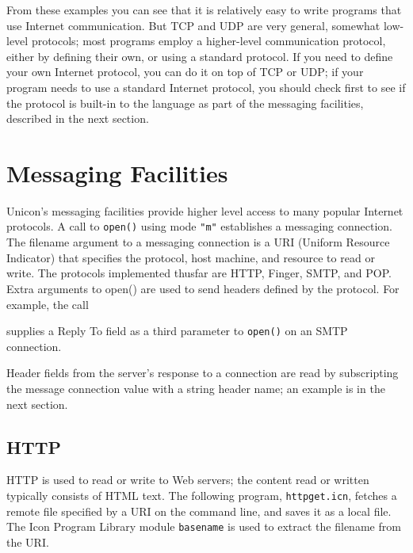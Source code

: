 From these examples you can see that it is relatively easy to write
programs that use Internet communication. But TCP and UDP are very
general, somewhat low-level protocols; most programs employ a
higher-level communication protocol, either by defining their own, or
using a standard protocol. If you need to define your own Internet
protocol, you can do it on top of TCP or UDP; if your program needs to
use a standard Internet protocol, you should check first to see if the
protocol is built-in to the language as part of the messaging
facilities, described in the next section.

\section{Messaging Facilities}

Unicon's messaging facilities provide
higher level access to many popular Internet protocols. A call to
\texttt{open()} using mode \texttt{"m"}
establishes a messaging connection. The filename argument to a
messaging connection is a URI (Uniform Resource Indicator) that
specifies the protocol, host machine, and resource to read or write.
The protocols implemented thusfar are HTTP, Finger, SMTP, and POP.
Extra arguments to open() are used to send headers defined by the
protocol. For example, the call


\noindent
supplies a Reply To field as a third parameter to \texttt{open()} on an
SMTP connection.

Header fields from the server's response to a
connection are read by subscripting the message connection value
with a string header name; an example is in the next section.

\subsection{HTTP}

HTTP is used to read or write to Web servers; the content
read or written typically consists of HTML text. The
following program, \texttt{httpget.icn}, fetches a remote file
specified by a URI on the command line, and saves it as a local file.
The Icon Program Library module \texttt{basename} is used to extract
the filename from the URI.



